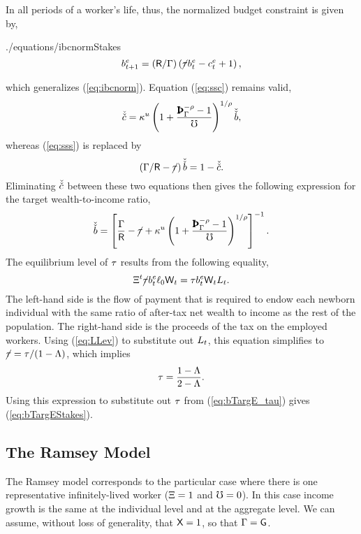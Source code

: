 \documentclass[titlepage,abstract,letterpaper]{econtex}
\begin{document}
In all periods of a worker's life, thus, the normalized budget constraint is given by,
\begin{verbatimwrite}{./equations/ibcnormStakes}
\begin{equation}
b^{e}_{t+1} = (\mathsf{R} /\Gamma) \left(\cancel{\tau} b^{e}_{t} -c^{e}_{t}+1\right),
\label{eq:ibcnormStakes}
\end{equation}
\end{verbatimwrite}

which generalizes (\ref{eq:ibcnorm}). Equation (\ref{eq:ssc}) remains valid,
\begin{equation*}
\cTargTarg = \MPCU \left(1+\frac{\PatPGro^{-\CRRA}-1}{\urate}\right)^{1/\CRRA} \bTargTarg,
\end{equation*}
whereas (\ref{eq:sss}) is replaced by
\begin{equation*}
\left(\Gamma/\mathsf{R}-\cancel{\tau} \right) \check{\check{b}} = 1 -\check{\check{c}}.
\end{equation*}
Eliminating $\check{\check{c}}$ between these two equations then gives the following expression for the target wealth-to-income ratio,
\begin{equation}
 \bTargTarg= \left[\frac{\PGro}{\Rfree}-\TaxFree+\MPCU \left(1+\frac{\PatPGro^{-\CRRA}-1}{\urate}\right)^{1/\CRRA}\right]^{-1}.
\label{eq:bTargE_tau}
\end{equation}
The equilibrium level of $\tau$ results from the following equality,
\begin{equation*}
\Xi^t \cancel{\tau} b^{e}_t \ell_0 \mathsf{W}_t  = \tau b^{e}_t \mathsf{W}_t L_t.
\label{eq:gbc}
\end{equation*}
The left-hand side is the flow of payment that is required to endow each newborn individual with the same ratio of after-tax net wealth to income as the rest of the population. The right-hand side is the proceeds of the tax on the employed workers. Using (\ref{eq:LLev}) to substitute out $L_t$, this equation simplifies to $\cancel{\tau} = \tau / (1-
\Lambda)$, which implies
\begin{equation}
\tau=\frac{1-\Lambda}{2-\Lambda}.
\label{eq:tau}
\end{equation}
Using this expression to substitute out $\tau$ from (\ref{eq:bTargE_tau}) gives (\ref{eq:bTargEStakes}).

\subsection{The Ramsey Model}

The Ramsey model corresponds to the particular case where there is one representative infinitely-lived worker ($\Xi=1$ and $\mho=0$). In this case income growth is the same at the individual level and at the aggregate level. We can assume, without loss of generality, that $\mathsf{X}=1$, so that $\Gamma=\mathsf{G}$.
\end{document}
